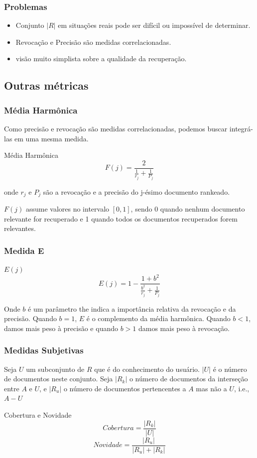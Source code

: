 \documentclass[compress]{beamer}
\begin{document}
\begin{frame}[fragile]
\frametitle{Problemas}
\begin{itemize}
 \item Conjunto $|R|$ em situações reais pode ser difícil ou impossível de determinar.
  \item Revocação e Precisão são medidas correlacionadas.
\item visão muito simplista sobre a qualidade da recuperação.
\end{itemize}
\end{frame}

\subsection{Outras métricas}

\begin{frame}[fragile]
\frametitle{Média Harmônica}
Como precisão e revocação são medidas correlacionadas, podemos buscar integrá-las em uma mesma medida.
\begin{block}{Média Harmônica}
\begin{equation*}
 F(j)=\frac{2}{\frac{1}{r_j}+\frac{1}{P_j}}
\end{equation*}
\end{block}
onde $r_j$ e $P_j$ são a revocação e a precisão do j-ésimo documento rankeado.

$F(j)$ assume valores no intervalo $\left[ 0,1\right]$, sendo $0$ quando nenhum documento relevante for recuperado e 1 quando todos os documentos recuperados forem relevantes.
\end{frame}

\begin{frame}[fragile]
\frametitle{Medida E}
\begin{block}{$E(j)$}
$$
 E(j)=1-\frac{1+b^2}{\frac{b^2}{r_j}+\frac{1}{P_j}}
$$
\end{block}

Onde $b$ é um parâmetro the indica a importância relativa da revocação e da precisão. Quando $b=1$, $E$ é o complemento da média harmônica. Quando $b<1$, damos mais peso à precisão e quando $b>1$ damos mais peso à revocação.

\end{frame}

\begin{frame}[fragile]
\frametitle{Medidas Subjetivas}
Seja $U$ um subconjunto de $R$ que é do conhecimento do usuário. $|U|$ é o número de documentos neste conjunto. Seja $|R_k|$ o número de documentos da interseção entre $A$ e $U$, e $|R_u|$ o número de documentos pertencentes a $A$ mas não a $U$, i.e., $A-U$
\begin{block}{Cobertura e Novidade}
$$
Cobertura = \frac{|R_k|}{|U|}
$$
$$
Novidade = \frac{|R_u|}{|R_u|+|R_k|}
$$
\end{block}
\end{frame}
\end{document}
